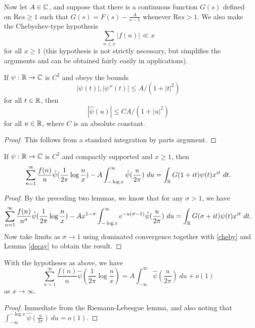 Now let $A \in \C$, and suppose that there is a continuous function $G(s)$ defined on $\mathrm{Re} s \geq 1$ such that $G(s) = F(s) - \frac{A}{s-1}$ whenever $\mathrm{Re} s > 1$.  We also make the Chebyshev-type hypothesis
\begin{equation}\label{cheby}
\sum_{n \leq x} |f(n)| \ll x
\end{equation}
for all $x \geq 1$ (this hypothesis is not strictly necessary, but simplifies the arguments and can be obtained fairly easily in applications).

\begin{lemma}\label{decay}  If $\psi:\R \to \C$ is $C^2$ and obeys the bounds
  $$ |\psi(t)|, |\psi''(t)| \leq A / (1 + |t|^2)$$
  for all $t \in \R$, then
$$ |\hat \psi(u)| \leq C A / (1+|u|^2)$$
for all $u \in \R$, where $C$ is an absolute constant.
\end{lemma}

\begin{proof} This follows from a standard integration by parts argument.
\end{proof}

\begin{lemma}\label{limiting}  If $\psi: \R \to \C$ is $C^2$ and compactly supported and $x \geq 1$, then
$$ \sum_{n=1}^\infty \frac{f(n)}{n} \hat \psi( \frac{1}{2\pi} \log \frac{n}{x} ) - A \int_{-\log x}^\infty \hat \psi(\frac{u}{2\pi})\ du =  \int_\R G(1+it) \psi(t) x^{it}\ dt.$$
\end{lemma}

\begin{proof}  By the preceding two lemmas, we know that for any $\sigma>1$, we have
  $$ \sum_{n=1}^\infty \frac{f(n)}{n^\sigma} \hat \psi( \frac{1}{2\pi} \log \frac{n}{x} ) - A x^{1-\sigma} \int_{-\log x}^\infty e^{-u(\sigma-1)} \hat \psi(\frac{u}{2\pi})\ du =  \int_\R G(\sigma+it) \psi(t) x^{it}\ dt.$$
  Now take limits as $\sigma \to 1$ using dominated convergence together with \eqref{cheby} and Lemma \ref{decay} to obtain the result.
\end{proof}

\begin{corollary}\label{limiting-cor}  With the hypotheses as above, we have
  $$ \sum_{n=1}^\infty \frac{f(n)}{n} \hat \psi( \frac{1}{2\pi} \log \frac{n}{x} ) = A \int_{-\infty}^\infty \hat \psi(\frac{u}{2\pi})\ du + o(1)$$
  as $x \to \infty$.
\end{corollary}

\begin{proof} Immediate from the Riemann-Lebesgue lemma, and also noting that $\int_{-\infty}^{-\log x} \hat \psi(\frac{u}{2\pi})\ du = o(1)$.
\end{proof}

